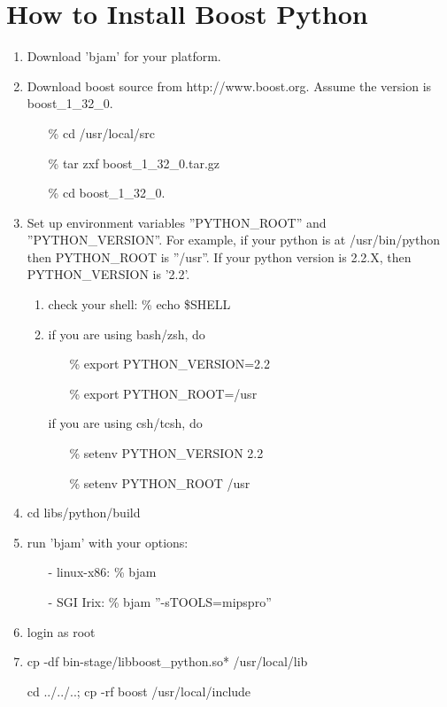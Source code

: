 %


\section{How to Install Boost Python}
\label{HELP-OPT-PROG-INST}
  \begin{enumerate}
    \item
      Download 'bjam' for your platform.
    \item
      Download boost source from http://www.boost.org. Assume the
      version is boost\_1\_32\_0.
      \begin{itemize}
        \item[\%] cd /usr/local/src
	\item[\%] tar zxf boost\_1\_32\_0.tar.gz
	\item[\%] cd boost\_1\_32\_0.
      \end{itemize}

    \item
      Set up environment variables ''PYTHON\_ROOT'' and ''PYTHON\_VERSION''.
       For example, if your python is at /usr/bin/python then PYTHON\_ROOT is
       ''/usr''. If your python version is 2.2.X, then PYTHON\_VERSION
       is '2.2'.
       \begin{enumerate}
       \item 
	 check your shell: \% echo \$SHELL
       
       \item
	 if you are using bash/zsh, do
	 \begin{itemize}
           \item[\%] export PYTHON\_VERSION=2.2
           \item[\%] export PYTHON\_ROOT=/usr
	 \end{itemize}

          if you are using csh/tcsh, do
	  \begin{itemize}
            \item[\%] setenv PYTHON\_VERSION 2.2
            \item[\%] setenv PYTHON\_ROOT /usr
	  \end{itemize}
       \end{enumerate}

     \item
       cd libs/python/build
    
     \item
       run 'bjam' with your options:
       \begin{itemize}
	 \item[-] linux-x86: \% bjam
	 \item[-] SGI Irix:  \% bjam ''-sTOOLS=mipspro''
       \end{itemize}

     \item
       login as root
    
     \item
       cp -df bin-stage/libboost\_python.so* /usr/local/lib

       cd ../../..; cp -rf boost /usr/local/include

  \end{enumerate}


